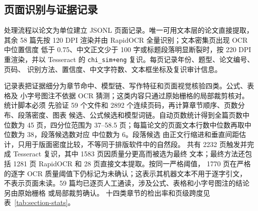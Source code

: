 \subsection{页面识别与证据记录}

处理流程以论文为单位建立 JSONL 页面记录。唯一可用文本层的论文直接提取，其余
58 篇先按 120 DPI 渲染并由 RapidOCR 全量识别；文本密集页出现 OCR 中位置信度
低于 0.75、中文正文少于 100 字或标题段落明显断裂时，按 220 DPI 重渲染，并以
Tesseract 的 \texttt{chi\_sim+eng} 复识。每页记录年份、题型、论文编号、页码、
识别方法、置信度、中文字符数、文本框坐标及复识审计信息。

记录表把证据细分为章节命中、模型链、写作特征和页面视觉核验四类。公式、表格及
小字号图注不依据 OCR 猜测；这类内容只通过原始栅格的局部裁剪核对。统计脚本必须
先验证 59 个文件和 2892 个连续页码，再计算章节顺序、页数分布、段落密度、图表
候选、公式候选和模型词链。自动页数统计得到全篇页数中位数为 45 页，四分位范围为
37--58.5 页；每篇论文的页面文本行数中位数再取中位数为 38，段落候选数对应
中位数为 6。段落候选
由正文行缩进和垂直间距估计，只用于版面密度比较，不等同于排版软件中的自然段。
共有 2232 页触发并完成 Tesseract 复识，其中 1583 页因质量分更高而被选为最终
文本；最终方法还包括 1281 页 RapidOCR 和 28 页直接文本提取。按同一严格阈值，
1770 页在严格的逐字 OCR 质量阈值下仍标记为未确认；这表示其机器文本不用于逐字引文，
不表示页面未读。59 篇均已逐页人工通读，涉及公式、表格和小字号图注的结论另由原始栅格
或局部裁剪确认。
十四类章节的检出率和页级跨度见表~\ref{tab:section-stats}。

